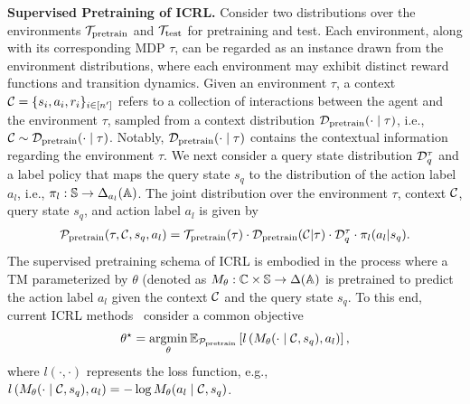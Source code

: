 \documentclass{article}
\begin{document}
\textbf{Supervised Pretraining of ICRL.}
%
%
%
Consider two distributions over the environments ${\mathcal T}_{\text{pretrain}}$ and ${\mathcal T}_{\text{test}}$ for pretraining and test. Each environment, along with its corresponding MDP $\tau$, can be regarded as an instance drawn from the environment distributions, where each environment may exhibit distinct reward functions and transition dynamics. Given an environment $\tau$, a context ${\mathcal C} = \{s_i, a_i, r_i\}_{i \in [n']}$ refers to a collection of interactions between the agent and the environment $\tau$, sampled from a context distribution ${\mathcal D}_{\text{pretrain}} (\cdot \mid \tau)$, i.e., ${\mathcal C} \sim {\ensuremath{\mathcal D}}_{\text{pretrain}} (\cdot \mid \tau)$. Notably, ${\mathcal D}_{\text{pretrain}} (\cdot \mid \tau)$ contains the contextual information regarding the environment $\tau$.
We next consider a query state distribution ${\mathcal D}_q^\tau$ and a label policy that maps the query state $s_q$ to the distribution of the action label $a_l$, i.e., $\pi_{l}: {\mathbb S} \to \Delta_{a_l} ({\mathbb A})$. 
The joint distribution over the environment $\tau$, context ${\mathcal C}$, query state $s_{q}$, and action label $a_{l}$ is given by
\begin{align}\label{eqn_pretrain_distribution}
    {\ensuremath{\mathcal P}}_{\text{pretrain}} (\tau, {\mathcal C}, s_{q}, a_{l}) = {\mathcal T}_{\text{pretrain}} (\tau) \cdot {\ensuremath{\mathcal D}}_{\text{pretrain}} ({\mathcal C} | \tau) \cdot {\ensuremath{\mathcal D}}_q^\tau \cdot \pi_{l}(a_{l} | s_{q}).
\end{align}
%
The supervised pretraining schema of ICRL is embodied in the process where a TM parameterized by $\theta$ (denoted as $M_\theta: {\mathbb C} \times {\ensuremath{\mathbb S}} \to \Delta({\mathbb A})$ is pretrained to predict the action label $a_l$ given the context ${\mathcal C}$ and the query state $s_q$. To this end, current ICRL methods~\citep{laskin2022context, lee2024supervised, chen2025random, son2025distilling} consider a common objective
%
\begin{align}\label{eqn_icrl_obj_unweighted}
    \theta^\star = \argmin_\theta \mbE_{\ccalP_{\text{pretrain}}} \left[ l \left( M_\theta(\cdot \mid \ccalC, s_{q}), a_{l}\right) \right],
\end{align}
%
where $l(\cdot, \cdot)$ represents the loss function, e.g., $l \left( M_\theta(\cdot \mid {\ensuremath{\mathcal C}}, s_{q}), a_{l}\right) = -
\log M_\theta(a_l \mid {\ensuremath{\mathcal C}}, s_{q})$. 
%
\end{document}
